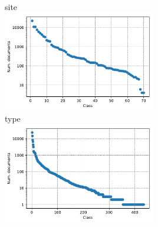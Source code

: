 \begin{frame}
  \centering
  site\\
  \includegraphics[width=0.5\textwidth]{img/classDist-icdo3-site.pdf}\\
  type\\
  \includegraphics[width=0.5\textwidth]{img/classDist-icdo3-type.pdf}
\end{frame}

